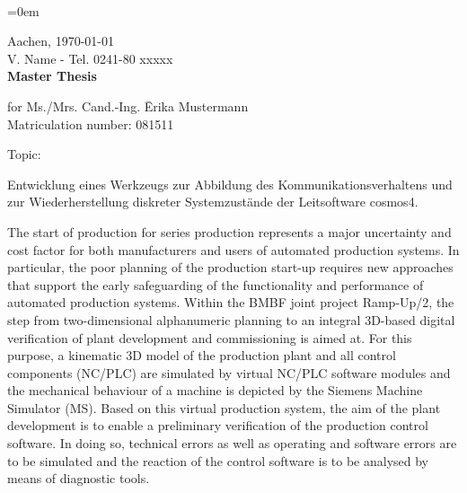 \pagestyle{empty}
~
\newpage
{}
\parindent=0em

Aachen, \verbosedate\today\\
V. Name - Tel. 0241-80 xxxxx\\[2cm]

{\huge \bf Master Thesis}\\[1cm] %


\begin{tabbing}
for Ms./Mrs. Cand.-Ing. \quad \= Erika Mustermann\\
\> Matriculation number: 081511\\

	
\end{tabbing}

\begin{minipage}[t]{0.1\textwidth}
Topic: %
\quad
\end{minipage}
\begin{minipage}[t]{0.9\textwidth}
	Entwicklung eines Werkzeugs zur Abbildung des Kommunikationsverhaltens und zur Wiederherstellung diskreter Systemzustände der Leitsoftware cosmos4.\\
\end{minipage}

The start of production for series production represents a major uncertainty and cost factor for both manufacturers and users of automated production systems. In particular, the poor planning of the production start-up requires new approaches that support the early safeguarding of the functionality and performance of automated production systems. Within the BMBF joint project Ramp-Up/2, the step from two-dimensional alphanumeric planning to an integral 3D-based digital verification of plant development and commissioning is aimed at. For this purpose, a kinematic 3D model of the production plant and all control components (NC/PLC) are simulated by virtual NC/PLC software modules and the mechanical behaviour of a machine is depicted by the Siemens Machine Simulator (MS). Based on this virtual production system, the aim of the plant development is to enable a preliminary verification of the production control software. In doing so, technical errors as well as operating and software errors are to be simulated and the reaction of the control software is to be analysed by means of diagnostic tools.

